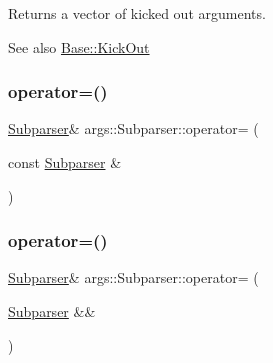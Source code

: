 Returns a vector of kicked out arguments.

\begin{DoxySeeAlso}{See also}
\hyperlink{classargs_1_1_base_a2a1d655c5d36c58fd19ca30d927d85b8}{Base\+::\+Kick\+Out} 
\end{DoxySeeAlso}
\mbox{\label{classargs_1_1_subparser_a8eb8bfab0fefbc937d6549bf5e63ea8f}} 
\subsubsection{\texorpdfstring{operator=()}{operator=()}\hspace{0.1cm}{\footnotesize\ttfamily [1/2]}}
{\footnotesize\ttfamily \hyperlink{classargs_1_1_subparser}{Subparser}\& args\+::\+Subparser\+::operator= (\begin{DoxyParamCaption}\item[{const \hyperlink{classargs_1_1_subparser}{Subparser} \&}]{ }\end{DoxyParamCaption})\hspace{0.3cm}{\ttfamily [delete]}}

\mbox{\label{classargs_1_1_subparser_ac4821d34029cac237edd11ec6c1d0e0f}} 
\subsubsection{\texorpdfstring{operator=()}{operator=()}\hspace{0.1cm}{\footnotesize\ttfamily [2/2]}}
{\footnotesize\ttfamily \hyperlink{classargs_1_1_subparser}{Subparser}\& args\+::\+Subparser\+::operator= (\begin{DoxyParamCaption}\item[{\hyperlink{classargs_1_1_subparser}{Subparser} \&\&}]{ }\end{DoxyParamCaption})\hspace{0.3cm}{\ttfamily [delete]}}

\mbox{\label{classargs_1_1_subparser_a9a21d184d749d4b5d8b6bddd4c5fda33}} 
